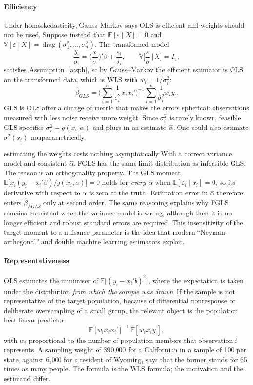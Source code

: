 \documentclass[11pt,a4paper]{article}
\newcommand{\E}{\mathbb{E}}
\newcommand{\V}{\mathbb{V}}
\newcommand{\bh}{\hat\beta}
\begin{document}
\paragraph{Efficiency}
Under homoskedasticity, Gauss--Markov says OLS is efficient and weights should not be used. Suppose instead that $\E[\varepsilon\mid X]=0$ and $\V[\varepsilon\mid X]=\operatorname{diag}(\sigma_1^2,\dots,\sigma_n^2)$. The transformed model
\[
\frac{y_i}{\sigma_i}=\Big(\frac{x_i}{\sigma_i}\Big)'\beta+\frac{\varepsilon_i}{\sigma_i},\qquad\V\Big[\frac{\varepsilon}{\sigma}\,\Big|\,X\Big]=I_n,
\]
satisfies Assumption~\ref{a:sph}, so by Gauss--Markov the efficient estimator is OLS on the transformed data, which is WLS with $w_i=1/\sigma_i^2$:
\[
\bh_{GLS}=\Big(\sum_{i=1}^n\frac{1}{\sigma_i^2}x_ix_i'\Big)^{-1}\sum_{i=1}^n\frac{1}{\sigma_i^2}x_iy_i .
\]
GLS is OLS after a change of metric that makes the errors spherical: observations measured with less noise receive more weight. Since $\sigma_i^2$ is rarely known, feasible GLS specifies $\sigma_i^2=g(x_i,\alpha)$ and plugs in an estimate $\hat\alpha$. One could also estimate $\sigma^2(x_i)$ nonparametrically.

\begin{whybox}{estimating the weights costs nothing asymptotically}
With a correct variance model and consistent $\hat\alpha$, FGLS has the same limit distribution as infeasible GLS. The reason is an orthogonality property. The GLS moment $\E\big[x_i(y_i-x_i'\beta)/g(x_i,\alpha)\big]=0$ holds for \emph{every} $\alpha$ when $\E[\varepsilon_i\mid x_i]=0$, so its derivative with respect to $\alpha$ is zero at the truth. Estimation error in $\hat\alpha$ therefore enters $\bh_{FGLS}$ only at second order. The same reasoning explains why FGLS remains consistent when the variance model is wrong, although then it is no longer efficient and robust standard errors are required. This insensitivity of the target moment to a nuisance parameter is the idea that modern ``Neyman-orthogonal'' and double machine learning estimators exploit.
\end{whybox}

\paragraph{Representativeness}
OLS estimates the minimiser of $\E\big[(y_i-x_i'b)^2\big]$, where the expectation is taken under the distribution \emph{from which the sample was drawn}. If the sample is not representative of the target population, because of differential nonresponse or deliberate oversampling of a small group, the relevant object is the population best linear predictor
\[
\E[w_ix_ix_i']^{-1}\,\E[w_ix_iy_i],
\]
with $w_i$ proportional to the number of population members that observation $i$ represents. A sampling weight of 390{,}000 for a Californian in a sample of 100 per state, against 6{,}000 for a resident of Wyoming, says that the former stands for 65 times as many people. The formula is the WLS formula; the motivation and the estimand differ.
\end{document}

